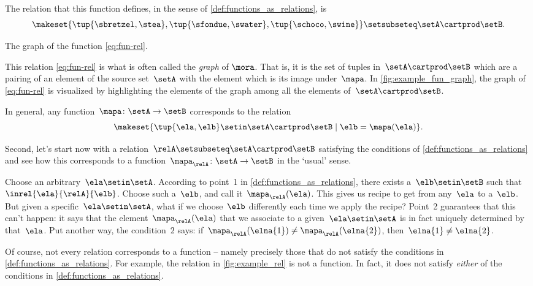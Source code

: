 The relation that this function defines, in the sense of \cref{def:functions_as_relations}, is
%
\begin{equation}
    \label{eq:fun-rel}
    \makeset{ \tup{\sbretzel, \stea}, \tup{\sfondue, \swater}, \tup{\schoco, \swine} } \setsubseteq \setA \cartprod \setB.
\end{equation}

\begin{marginfigure}
    \centering
    \caption{The graph of the function \cref{eq:fun-rel}.}
    \label{fig:example_fun_graph}
\end{marginfigure}

This relation \cref{eq:fun-rel} is what is often called the \emph{graph} of $\mora$.
That is, it is the set of tuples in~$\setA \cartprod \setB$ which are a pairing of an element of the source set~$\setA$ with the element which is its image under~$\mapa$.
In \cref{fig:example_fun_graph}, the graph of \cref{eq:fun-rel} is visualized by highlighting the elements of the graph among all the elements of~$\setA \cartprod \setB$.

In general, any function~$\mapa \colon \setA \to \setB$ corresponds to the relation
\begin{equation}
    \makeset{ \tup{\ela,\elb} \setin \setA \cartprod \setB \mid \elb= \mapa(\ela) }.
\end{equation}

Second, let's start now with a relation~$\relA \setsubseteq \setA \cartprod \setB$ satisfying the conditions of \cref{def:functions_as_relations} and see how this corresponds to a function~$\mapa_\relA \colon \setA \to \setB$ in the `usual' sense.

Choose an arbitrary~$\ela \setin \setA$.
According to point~1 in \cref{def:functions_as_relations}, there exists a~$\elb \setin \setB$ such that~$\inrel{\ela}{\relA}{\elb}$.
Choose such a~$\elb$, and call it~$\mapa_\relA(\ela)$.
This gives us recipe to get from any~$\ela$ to a~$\elb$.
But given a specific~$\ela \setin \setA$, what if we choose~$\elb$ differently each time we apply the recipe?
Point~2 guarantees that this can't happen: it says that the element~$\mapa_\relA(\ela)$ that we associate to a given~$\ela \setin \setA$ is in fact uniquely determined by that~$\ela$.
Put another way, the condition~$2$ says: if~$\mapa_\relA(\elna{1}) \neq \mapa_\relA(\elna{2})$, then~$\elna{1} \neq\elna{2}$.

\begin{remark}
    Of course, not every relation corresponds to a function -- namely precisely those that do not satisfy the conditions in \cref{def:functions_as_relations}.
    For example, the relation in \cref{fig:example_rel} is not a function.
    In fact, it does not satisfy \emph{either} of the conditions in \cref{def:functions_as_relations}.
\end{remark}

